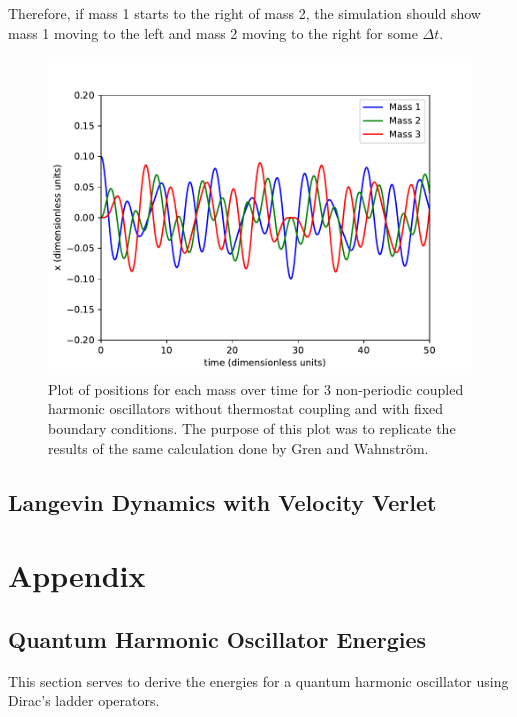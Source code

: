 \documentclass{article}
\begin{document}
Therefore, if mass 1 starts to the right of mass 2, the simulation should show mass 1 moving to the left and mass 2 moving to the right for some $\Delta t$.
\begin{figure}[H]
  \centering
  \includegraphics[scale=0.7]{Figures/1dverlet/3part_2walls.pdf}
    \caption{Plot of positions for each mass over time for 3 non-periodic coupled harmonic oscillators without thermostat coupling and with fixed boundary conditions. The purpose of this plot was to replicate the results of the same calculation done by Gren and Wahnstr\"om.\cite{gren}}
\end{figure}

\subsection{Langevin Dynamics with Velocity Verlet}


\section{Appendix}
\subsection{Quantum Harmonic Oscillator Energies}
This section serves to derive the energies for a quantum harmonic oscillator using Dirac's ladder operators.
\end{document}
